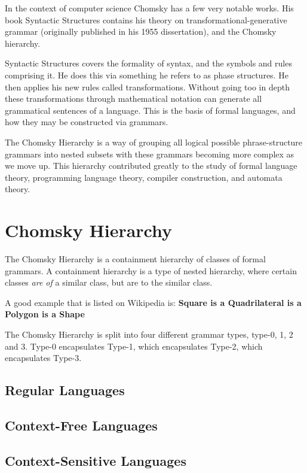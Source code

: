 \documentclass{article}
\begin{document}
In the context of computer science Chomsky has a few very notable works. 
His book Syntactic Structures contains his theory on transformational-generative grammar (originally published in his 1955 dissertation), and the Chomsky hierarchy.
\medskip

Syntactic Structures covers the formality of syntax, and the symbols and rules comprising it. He does this via something he refers to as phase structures. 
He then applies his new rules called transformations. Without going too in depth these transformations through mathematical notation can generate all grammatical sentences of a language. 
This is the basis of formal languages, and how they may be constructed via grammars. 
\medskip

The Chomsky Hierarchy is a way of grouping all logical possible phrase-structure grammars into nested subsets with these grammars becoming more complex as we move up. 
This hierarchy contributed greatly to the study of formal language theory, programming language theory, compiler construction, and automata theory.

\section{Chomsky Hierarchy}  

The Chomsky Hierarchy is a containment hierarchy of classes of formal grammars.
A containment hierarchy is a type of nested hierarchy, where certain classes \textit{are of} a similar class, but are  to the similar class.

A good example that is listed on Wikipedia is:
\textbf{Square is a Quadrilateral is a Polygon is a Shape}

The Chomsky Hierarchy is split into four different grammar types, type-0, 1, 2 and 3.
Type-0 encapsulates Type-1, which encapsulates Type-2, which encapsulates Type-3.

\subsection{Regular Languages} 

\subsection{Context-Free Languages}

\subsection{Context-Sensitive Languages} 
\end{document}
